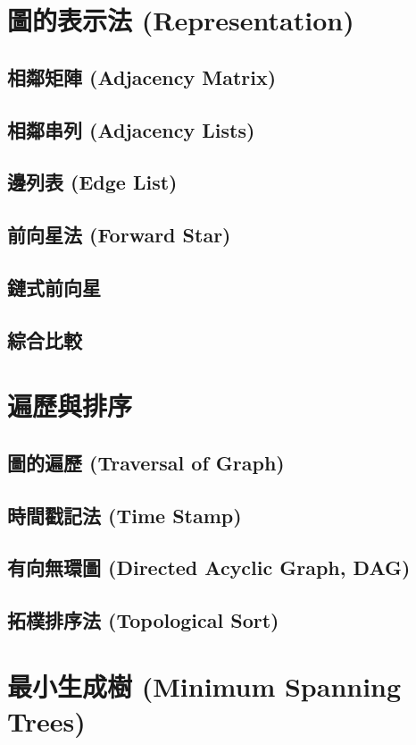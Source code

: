 \documentclass[12pt,a4paper,oneside]{report}
\begin{document}
\begin{CJK}{UTF8}{bkai}
\section{圖的表示法 (Representation)}
\subsection{相鄰矩陣 (Adjacency Matrix)}
\subsection{相鄰串列 (Adjacency Lists)}
\subsection{邊列表 (Edge List)}
\subsection{前向星法 (Forward Star)}
\subsection{鏈式前向星}
\subsection{綜合比較}

\section{遍歷與排序}
\subsection{圖的遍歷 (Traversal of Graph)}
\subsection{時間戳記法 (Time Stamp)}
\subsection{有向無環圖 (Directed Acyclic Graph, DAG)}
\subsection{拓樸排序法 (Topological Sort)}

\section{最小生成樹 (Minimum Spanning Trees)}


\end{CJK}
\end{document}
